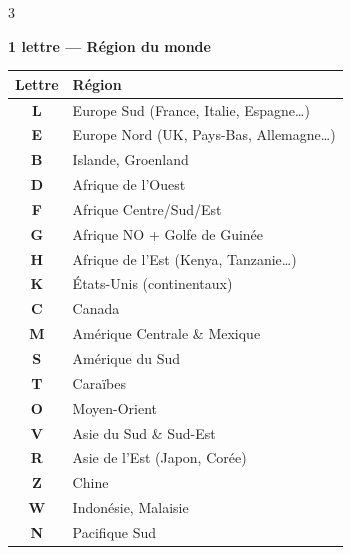 \documentclass[9pt,a4paper,landscape]{article}
\begin{document}
\begin{multicols}{3}
\scriptsize

\textbf{\color{afblue}1 lettre --- Région du monde}\\[-0.1cm]
\begin{tabular}{cl}
\toprule
\textbf{Lettre} & \textbf{Région} \\
\midrule
\rowcolor{eurlight} \textbf{L} & Europe Sud (France, Italie, Espagne\ldots) \\
\textbf{E} & Europe Nord (UK, Pays-Bas, Allemagne\ldots) \\
\rowcolor{eurlight} \textbf{B} & Islande, Groenland \\
\textbf{D} & Afrique de l'Ouest \\
\rowcolor{afrlight} \textbf{F} & Afrique Centre/Sud/Est \\
\textbf{G} & Afrique NO + Golfe de Guinée \\
\rowcolor{afrlight} \textbf{H} & Afrique de l'Est (Kenya, Tanzanie\ldots) \\
\textbf{K} & États-Unis (continentaux) \\
\rowcolor{amerlight} \textbf{C} & Canada \\
\textbf{M} & Amérique Centrale \& Mexique \\
\rowcolor{amerlight} \textbf{S} & Amérique du Sud \\
\textbf{T} & Caraïbes \\
\rowcolor{asilight} \textbf{O} & Moyen-Orient \\
\textbf{V} & Asie du Sud \& Sud-Est \\
\rowcolor{asilight} \textbf{R} & Asie de l'Est (Japon, Corée) \\
\textbf{Z} & Chine \\
\rowcolor{asilight} \textbf{W} & Indonésie, Malaisie \\
\textbf{N} & Pacifique Sud \\
\bottomrule
\end{tabular}


\end{multicols}
\end{document}
